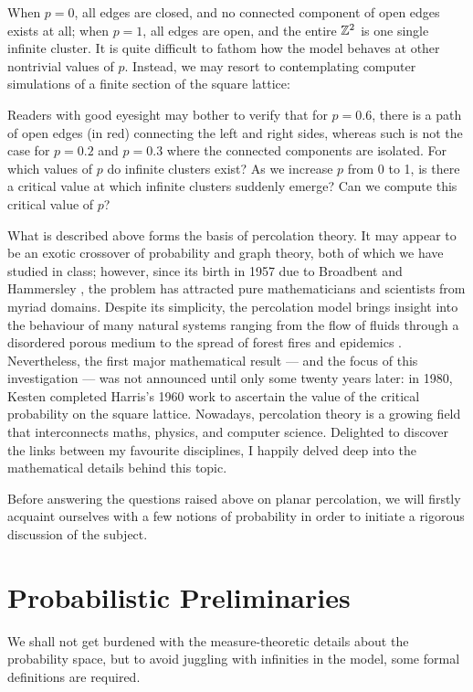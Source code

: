 \documentclass[a4paper, 12pt]{article}
\begin{document}
When $p = 0$, all edges are closed, and no connected component of open edges exists at all; when $p = 1$, all edges are open, and the entire $\mathbb{Z}^2$ is one single infinite cluster. It is quite difficult to fathom how the model behaves at other nontrivial values of $p$. Instead, we may resort to contemplating computer simulations of a finite section of the square lattice:


 
Readers with good eyesight may bother to verify that for $p = 0.6$, there is a path of open edges (in red) connecting the left and right sides, whereas such is not the case for $p = 0.2$ and $p = 0.3$ where the connected components are isolated. For which values of $p$ do infinite clusters exist? As we increase $p$ from 0 to 1, is there a critical value at which infinite clusters suddenly emerge? Can we compute this critical value of $p$? 

What is described above forms the basis of percolation theory. It may appear to be an exotic crossover of probability and graph theory, both of which we have studied in class; however, since its birth in 1957 due to Broadbent and Hammersley \autocite*[693]{broadbent_hammersley_1957}, the problem has attracted pure mathematicians and scientists from myriad domains. Despite its simplicity, the percolation model brings insight into the behaviour of many natural systems ranging from the flow of fluids through a disordered porous medium to the spread of forest fires and epidemics \autocite[60]{gennes_2000}. Nevertheless, the first major mathematical result --- and the focus of this investigation --- was not announced until only some twenty years later: in 1980, Kesten \autocite*[41]{kesten_1980} completed Harris's 1960 work \autocite*[13]{harris_1960} to ascertain the value of the critical probability on the square lattice. Nowadays, percolation theory is a growing field that interconnects maths, physics, and computer science. Delighted to discover the links between my favourite disciplines, I happily delved deep into the mathematical details behind this topic.

Before answering the questions raised above on planar percolation, we will firstly acquaint ourselves with a few notions of probability in order to initiate a rigorous discussion of the subject.

\section{Probabilistic Preliminaries}\label{ch:prelims}
We shall not get burdened with the measure-theoretic details about the probability space, but to avoid juggling with infinities in the model, some formal definitions are required.
\end{document}
